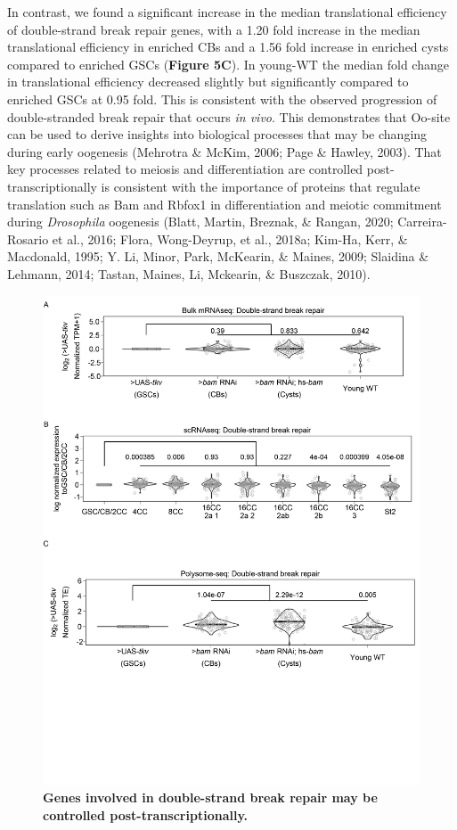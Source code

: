 \documentclass[12pt,oneside]{reedthesis}
\begin{document}
In contrast, we found a significant increase in the median translational
efficiency of double-strand break repair genes, with a 1.20 fold
increase in the median translational efficiency in enriched CBs and a
1.56 fold increase in enriched cysts compared to enriched GSCs (\textbf{Figure
5C}). In young-WT the median fold change in translational efficiency
decreased slightly but significantly compared to enriched GSCs at 0.95
fold. This is consistent with the observed progression of
double-stranded break repair that occurs \emph{in vivo}. This demonstrates
that Oo-site can be used to derive insights into biological processes
that may be changing during early oogenesis
(Mehrotra \& McKim, 2006; Page \& Hawley, 2003). That key processes related to
meiosis and differentiation are controlled post-transcriptionally is
consistent with the importance of proteins that regulate translation
such as Bam and Rbfox1 in differentiation and meiotic commitment during
\emph{Drosophila} oogenesis (Blatt, Martin, Breznak, \& Rangan, 2020; Carreira-Rosario et al., 2016; Flora, Wong-Deyrup, et al., 2018a; Kim-Ha, Kerr, \& Macdonald, 1995; Y. Li, Minor, Park, McKearin, \& Maines, 2009; Slaidina \& Lehmann, 2014; Tastan, Maines, Li, Mckearin, \& Buszczak, 2010).
\begin{figure}

{\centering \includegraphics[width=1\linewidth]{./figure/Oo_site/Figure5} 

}

\caption[\textbf{Genes involved in double-strand break repair may be controlled post-transcriptionally.}]{\textbf{Genes involved in double-strand break repair may be controlled post-transcriptionally.}}\label{fig:oosite-fig-8}
\end{figure}
\end{document}
